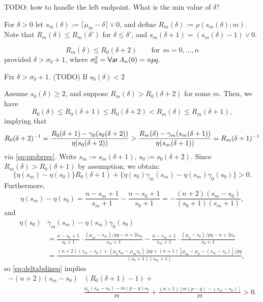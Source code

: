\documentclass[11pt,draft]{article}
\begin{document}
TODO: how to handle the left endpoint. What is the min value of $\delta$?

For $\delta > 0$ let $s_m(\delta) := \lceil \mu_m - \delta \rceil \vee 0$, and define $R_m(\delta) := \rho(s_m(\delta); m)$.
Note that $R_m(\delta) \leq R_m(\delta')$ for $\delta \leq \delta'$, and
$s_m(\delta + 1) = (s_m(\delta) - 1) \vee 0$.

\begin{prop}
\[ R_m(\delta) \leq R_0(\delta + 2)\qquad\text{for}\ \ m = 0,\dots,n \]
provided $\delta > \sigma_0 + 1$, where
$\sigma_0^2 = \operatorname{\mathsf{Var}} A_n(0) = npq$.
\end{prop}

\begin{pf}
Fix $\delta > \sigma_0 + 1$.
(TODO)
If $s_0(\delta) < 2$

Assume $s_0(\delta) \geq 2$, and suppose $R_m(\delta) > R_0(\delta + 2)$ for
some $m$.
Then, we have
\[ R_0(\delta) \leq R_0(\delta + 1) \leq R_0(\delta + 2) < R_m(\delta) \leq
R_m(\delta + 1),\]
implying that
\[ R_0(\delta + 2)^{-1} =
\frac{R_0(\delta+1) - \gamma_0(s_0(\delta+2))}{\eta(s_0(\delta+2))} > 
\frac{R_m(\delta) - \gamma_m(s_m(\delta+1))}{\eta(s_m(\delta+1))} =
R_m(\delta + 1)^{-1} \]
via \eqref{eq:probrrec}.
Write $s_m := s_m(\delta+1)$, $s_0 := s_0(\delta + 2)$.
Since $R_m(\delta) > R_0(\delta+1)$ by assumption, we obtain:
\begin{equation}\label{eq:deltabdineq}
\big\{\eta(s_m) - \eta(s_0)\big\} R_0(\delta + 1)
 + \big\{\eta(s_0)\gamma_m(s_m) - \eta(s_m)\gamma_0(s_0)\big\} > 0.
\end{equation}
Furthermore,
\[ \eta(s_m) - \eta(s_0)
= \frac{n - s_m + 1}{s_m + 1} - \frac{n - s_0 + 1}{s_0 + 1}
= -\frac{(n + 2)(s_m - s_0)}{(s_0 + 1)(s_m + 1)}, \]
and
\begin{align*}
\eta(s_0)&\gamma_m(s_m) - \eta(s_m)\gamma_0(s_0) \\
&= \frac{n - s_0 + 1}{s_0 + 1}\cdot \frac{(\mu_m - s_m)/pq - n + 2s_m}{s_m + 1} - 
\frac{n - s_m + 1}{s_m + 1}\cdot \frac{(\mu_0-s_0)/ pq - n + 2s_0}{s_0 + 1} \\
 &= \frac{(n+2)(s_m-s_0) + (\mu_0 s_m - \mu_m s_0)/pq +
 (n+1)[\mu_m - \mu_0 - (s_m - s_0)]/pq}{(s_0 + 1)(s_m + 1)},
\end{align*}
so \eqref{eq:deltabdineq} implies
\begin{align}
-(n+2)(s_m - s_0)&(R_0(\delta + 1) - 1) + \nonumber\\
&\frac{\mu_0 (s_m - s_0) - m(p-q) s_0}{pq} +
\frac{(n+1)[m(p-q) - (s_m - s_0)]}{pq} > 0. \label{eq:deltabdineq2}

\end{align}
\end{pf}
\end{document}
